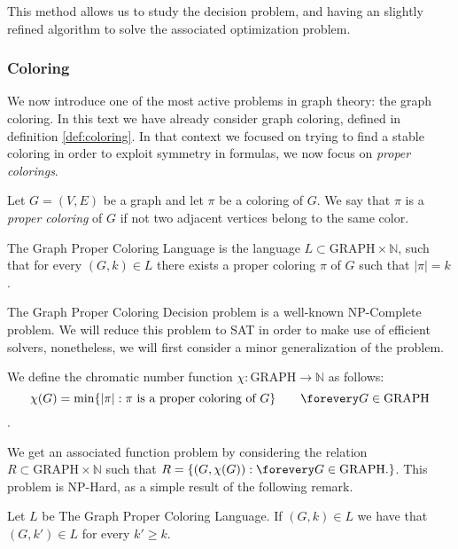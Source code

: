 This method allows us to study the decision problem, and having an slightly refined algorithm to solve the associated optimization problem. 

\subsubsection{Coloring}

We now introduce one of the most active problems in graph theory: the graph coloring. In this text we have already consider graph coloring, defined in definition \ref{def:coloring}. In that context we focused on  trying to find a stable coloring in order to exploit symmetry in formulas, we now focus on \emph{proper colorings}.



\begin{definition}
  Let $G=(V,E)$ be a graph and let $\pi$ be a coloring of $G$. We say that $\pi$ is a \emph{proper coloring} of $G$ if not two adjacent vertices belong to the same color.  
\end{definition}

\begin{definition}
  The Graph Proper Coloring Language is the language $L\subset \text{GRAPH}\times \mathbb{N}$, such that for every $(G,k)\in L$ there exists a proper coloring $\pi$ of $G$ such that $|\pi| = k$.  
\end{definition}

The  Graph Proper Coloring Decision problem is a well-known NP-Complete problem. We will reduce this problem to SAT in order to make use of efficient solvers, nonetheless, we will first consider a minor generalization of the problem.

\begin{definition}
  We define the chromatic number function $\chi:\text{GRAPH}\to \mathbb{N}$ as follows:
  $$ \chi(G) = \min\{|\pi|: \pi \text{ is a proper coloring of } G\} \qquad \forevery G \in \text{GRAPH}$$. 
\end{definition}

We get an associated function problem by considering the relation $R \subset \text{GRAPH}\times \mathbb{N}$ such that $R = \{(G,\chi(G)): \forevery G \in \text{GRAPH}.\}$. This problem is NP-Hard, as a simple result of the following remark.

\begin{remark}\label{remark:proper}
  Let $L$ be  The Graph Proper Coloring Language. If $(G,k) \in L$ we have that $(G,k')\in L$ for every $k'\ge k$.
\end{remark}

